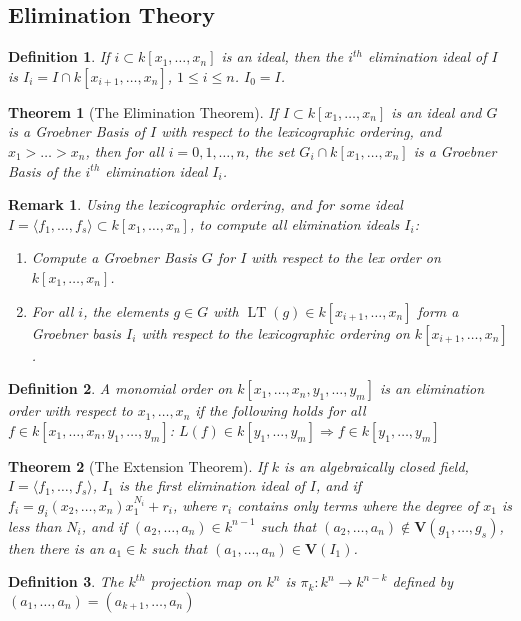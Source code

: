 \documentclass{article}
\theoremstyle{mystyle}
\newtheorem{theorem}{Theorem}[section]
\newtheorem{definition}{Definition}[section]
\newtheorem{remark}{Remark}[section]
\DeclareMathOperator{\LT}{LT}
\begin{document}
\subsection{Elimination Theory}
\begin{definition}
If $i\subset k[x_1,\hdots ,x_n]$ is an ideal, then the $i^{th}$ elimination ideal of $I$ is $I_{i} = I\cap k[x_{i+1},\hdots, x_n]$, $1\leq i \leq n$. $I_{0} = I$.
\end{definition}
\begin{theorem}[The Elimination Theorem]
If $I\subset k[x_1,\hdots ,x_n]$ is an ideal and $G$ is a Groebner Basis of $I$ with respect to the lexicographic ordering, and $x_1>\hdots > x_n$, then for all $i=0,1,\hdots, n$, the set $G_i \cap k[x_1,\hdots ,x_n]$ is a Groebner Basis of the $i^{th}$ elimination ideal $I_{i}$.
\end{theorem}
\begin{remark}
Using the lexicographic ordering, and for some ideal $I = \langle f_1,\hdots, f_s\rangle \subset k[x_1,\hdots ,x_n]$, to compute all elimination ideals $I_{i}$:
\begin{enumerate}
    \item Compute a Groebner Basis $G$ for $I$ with respect to the lex order on $k[x_1,\hdots ,x_n]$.
    \item For all $i$, the elements $g\in G$ with $\LT(g)\in k[x_{i+1},\hdots, x_n]$ form a Groebner basis $I_{i}$ with respect to the lexicographic ordering on $k[x_{i+1},\hdots, x_n]$.
\end{enumerate}
\end{remark}
\begin{definition}
A monomial order on $k[x_1,\hdots, x_n,y_1,\hdots, y_m]$ is an elimination order with respect to $x_1,\hdots, x_n$ if the following holds for all $f\in k[x_1,\hdots, x_n, y_1, \hdots, y_m]$: $L(f) \in k[y_1,\hdots, y_m] \Rightarrow f\in k[y_1,\hdots, y_m]$
\end{definition}
\begin{theorem}[The Extension Theorem]
If $k$ is an algebraically closed field, $I = \langle f_1,\hdots, f_s\rangle$, $I_{1}$ is the first elimination ideal of $I$, and if $f_i = g_i(x_2,\hdots, x_n)x_1^{N_i}+r_i$, where $r_i$ contains only terms where the degree of $x_1$ is less than $N_i$, and if $(a_2,\hdots, a_n)\in k^{n-1}$ such that $(a_2,\hdots, a_n) \notin \mathbf{V}(g_1,\hdots, g_s)$, then there is an $a_1 \in k$ such that $(a_1,\hdots, a_n) \in \mathbf{V}(I_1)$.
\end{theorem}
\begin{definition}
The $k^{th}$ projection map on $k^n$ is $\pi_{k}: k^n\rightarrow k^{n-k}$ defined by $(a_1,\hdots, a_n) = (a_{k+1},\hdots, a_n)$
\end{definition}
\end{document}
